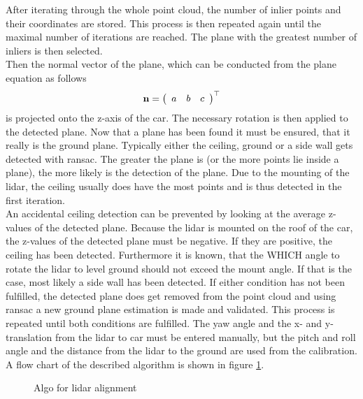 After iterating through the whole point cloud, the number of inlier points and their coordinates are stored.
This process is then repeated again until the maximal number of iterations are reached.
The plane with the greatest number of inliers is then selected.\\
Then the normal vector of the plane, which can be conducted from the plane equation as follows
\begin{equation}
    \vb{n} = \left(\begin{array}{lll} a & b & c \end{array}\right)^{\top}
\end{equation}
is projected onto the z-axis of the car.
The necessary rotation is then applied to the detected plane.
Now that a plane has been found it must be ensured, that it really is the ground plane.
Typically either the ceiling, ground or a side wall gets detected with \gls{ransac}.
The greater the plane is (or the more points lie inside a plane), the more likely is the detection of the plane.
Due to the mounting of the lidar, the ceiling usually does have the most points and is thus detected in the first iteration.\\
An accidental ceiling detection can be prevented by looking at the average z-values of the detected plane.
Because the lidar is mounted on the roof of the car, the z-values of the detected plane must be negative.
If they are positive, the ceiling has been detected.
Furthermore it is known, that the WHICH angle to rotate the lidar to level ground should not exceed the mount angle.
If that is the case, most likely a side wall has been detected.
If either condition has not been fulfilled, the detected plane does get removed from the point cloud and using \gls{ransac} a new ground plane estimation is made and validated.
This process is repeated until both conditions are fulfilled.
The yaw angle and the x- and y-translation from the \gls{lidar} to car
must be entered manually, but the pitch and roll angle and the distance from the \gls{lidar} to the ground are used from the calibration.
A flow chart of the described algorithm is shown in figure \ref{fig:flowchart_lidar_calibration}.
\begin{figure}[htb]
    \centering
    
    \caption{Algo for \acrshort{lidar} alignment}
    \label{fig:flowchart_lidar_calibration}
\end{figure}

